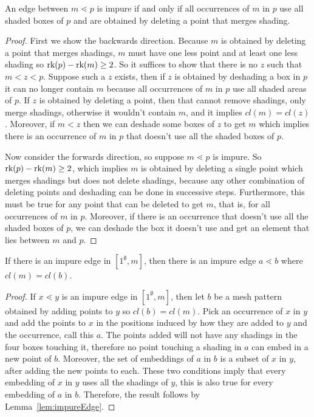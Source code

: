 \documentclass[11pt,a4paper,oneside]{article}
\begin{document}
\begin{lem}\label{lem:impureEdge}
An edge between $m\lessdot p$ is impure if and only if all occurrences of $m$ in
$p$ use all shaded boxes of $p$ and are obtained by deleting a point that merges
shading.
\begin{proof}
First we show the backwards direction. Because $m$ is obtained by deleting a
point that merges shadings, $m$ must have one less point and at least one less
shading so $\operatorname{\textrm{rk}}(p)-\operatorname{\textrm{rk}}(m)\ge2$. So it suffices to show that there is no $z$ such
that $m<z<p$. Suppose such a $z$ exists, then if $z$ is obtained by deshading a
box in $p$ it can no longer contain $m$ because all occurrences of $m$ in $p$
use all shaded areas of $p$. If $z$ is obtained by deleting a point, then that
cannot remove shadings, only merge shadings, otherwise it wouldn't contain $m$,
and it implies $cl(m)=cl(z)$. Moreover, if $m<z$ then we can deshade some boxes
of $z$ to get $m$ which implies there is an occurrence of $m$ in $p$ that
doesn't use all the shaded boxes of $p$.

Now consider the forwards direction, so suppose $m\lessdot p$ is impure. So
$\operatorname{\textrm{rk}}(p)-\operatorname{\textrm{rk}}(m)\ge2$, which implies $m$ is obtained by deleting a single point
which merges shadings but does not delete shadings, because any other
combination of deleting points and deshading can be done in successive steps.
Furthermore, this must be true for any point that can be deleted to get $m$,
that is, for all occurrences of $m$ in $p$. Moreover, if there is an occurrence
that doesn't use all the shaded boxes of $p$, we can deshade the box it doesn't
use and get an element that lies between $m$ and $p$.
\end{proof}
\end{lem}

\begin{lem}\label{lem:topImpure}
If there is an impure edge in $[1^\emptyset,m]$, then there is an impure edge
$a\lessdot b$ where $cl(m)=cl(b)$.
\begin{proof}
If $x\lessdot y$ is an impure edge in $[1^\emptyset,m]$, then let $b$ be a mesh
pattern obtained by adding points to $y$ so $cl(b) = cl(m)$. Pick
an occurrence of $x$ in $y$ and add the points to $x$ in the positions induced by
how they are added to $y$ and the occurrence, call this $a$. The points added
will not have any shadings in the four boxes touching it, therefore no point
touching a shading in $a$ can embed in a new point of $b$. Moreover, the set of
embeddings of $a$ in $b$ is a subset of $x$ in $y$, after adding the new points
to each. These two conditions imply that every embedding of $x$ in $y$ uses
all the shadings of $y$, this is also true for every embedding of $a$ in $b$.
Therefore, the result follows by Lemma~\ref{lem:impureEdge}.
\end{proof}
\end{lem}
\end{document}
